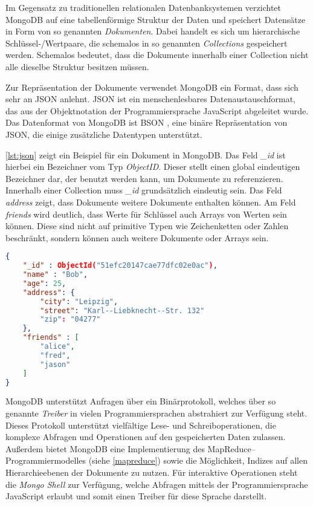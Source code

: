 Im Gegensatz zu traditionellen relationalen Datenbanksystemen verzichtet MongoDB auf eine tabellenförmige Struktur der Daten und speichert Datensätze in Form von so genannten \emph{Dokumenten}. Dabei handelt es sich um hierarchische Schlüssel-/Wertpaare, die schemalos in so genannten \emph{Collections} gespeichert werden. Schemalos bedeutet, dass die Dokumente innerhalb einer Collection nicht alle dieselbe Struktur besitzen müssen.

Zur Repräsentation der Dokumente verwendet MongoDB ein Format, dass sich sehr an JSON \cite{json2006} anlehnt. JSON ist ein menschenlesbares Datenaustauschformat, das aus der Objektnotation der Programmiersprache JavaScript abgeleitet wurde. Das Datenformat von MongoDB ist BSON \cite{bson2013}, eine binäre Repräsentation von JSON, die einige zusätzliche Datentypen unterstützt. 

\cref{lst:json} zeigt ein Beispiel für ein Dokument in MongoDB. Das Feld \emph{\_id} ist hierbei ein  Bezeichner vom Typ \emph{ObjectID}. Dieser stellt einen global eindeutigen Bezeichner dar, der benutzt werden kann, um Dokumente zu referenzieren. Innerhalb einer Collection muss \emph{\_id} grundsätzlich eindeutig sein. Das Feld \emph{address} zeigt, dass Dokumente weitere Dokumente enthalten können. Am Feld \emph{friends} wird deutlich, dass Werte für Schlüssel auch Arrays von Werten sein können. Diese sind nicht auf primitive Typen wie Zeichenketten oder Zahlen beschränkt, sondern können auch weitere Dokumente oder Arrays sein.

\begin{lstlisting}[language=json, label={lst:json}, caption={Ein Beispiel für ein Dokument in MongoDB}]
{
    "_id" : ObjectId("51efc20147cae77dfc02e0ac"),
    "name" : "Bob",
    "age": 25,
    "address": {
        "city": "Leipzig",
        "street": "Karl--Liebknecht--Str. 132"
        "zip": "04277"
    },
    "friends" : [
        "alice",
        "fred",
        "jason"
    ]
}
\end{lstlisting}

MongoDB unterstützt Anfragen über ein Binärprotokoll, welches über so genannte \emph{Treiber} in vielen Programmiersprachen abstrahiert zur Verfügung steht. Dieses Protokoll unterstützt vielfältige Lese- und Schreiboperationen, die komplexe Abfragen und Operationen auf den gespeicherten Daten zulassen. Außerdem bietet MongoDB eine Implementierung des MapReduce--Programmiermodelles (siehe \cref{mapreduce}) sowie die Möglichkeit, Indizes auf allen Hierarchieebenen der Dokumente zu nutzen. Für interaktive Operationen steht die \emph{Mongo Shell} zur Verfügung, welche Abfragen mittels der Programmiersprache JavaScript erlaubt und somit einen Treiber für diese Sprache darstellt.

